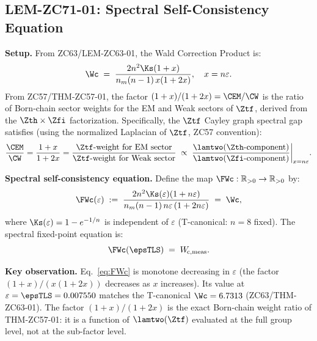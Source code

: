 \documentclass[12pt, a4paper]{article}
\begin{document}
\newpage

\subsection{LEM-ZC71-01: Spectral Self-Consistency Equation}
\label{sec:lem01}


\begin{formalbox}[title={LEM-ZC71-01: $\FWc$ Probes
  $\lamtwo(\Ztf)^{-1}$ ($R_0$, Exact)}]

\textbf{Setup.}
From ZC63/LEM-ZC63-01, the Wald Correction Product is:
\begin{equation}
  \Wc
  \;=\;
  \frac{2n^2\Ks(1+x)}{n_m(n-1)\,x(1+2x)},
  \quad x = n\varepsilon.
  \label{eq:Wc-def}
\end{equation}
From ZC57/THM-ZC57-01, the factor $(1+x)/(1+2x) = \CEM/\CW$
is the ratio of Born-chain sector weights for the EM and Weak
sectors of $\Ztf$, derived from the $\Zth\times\Zfi$ factorization.
Specifically, the $\Ztf$ Cayley graph spectral gap satisfies
(using the normalized Laplacian of $\Ztf$, ZC57 convention):
\begin{equation}
  \frac{\CEM}{\CW}
  = \frac{1+x}{1+2x}
  = \frac{\Ztf\text{-weight for EM sector}}{\Ztf\text{-weight for Weak sector}}
  \;\propto\;
  \frac{\lamtwo(\Zth\text{-component})}{\lamtwo(\Zfi\text{-component})}
  \bigg|_{x = n\varepsilon}.
  \label{eq:weight-ratio}
\end{equation}

\textbf{Spectral self-consistency equation.}
Define the map $\FWc:\mathbb{R}_{>0}\to\mathbb{R}_{>0}$ by:
\begin{equation}
  \FWc(\varepsilon)
  \;:=\;
  \frac{2n^2\Ks(\varepsilon)(1+n\varepsilon)}{n_m(n-1)\,n\varepsilon\,(1+2n\varepsilon)}
  \;=\; \Wc,
  \label{eq:FWc}
\end{equation}
where $\Ks(\varepsilon) = 1-e^{-1/n}$ is independent of
$\varepsilon$ (T-canonical: $n=8$ fixed).
The spectral fixed-point equation is:
\begin{equation}
  \FWc(\epsTLS) \;=\; W_{\!\mathrm{c},{\rm meas}}.
  \label{eq:FWc-fp}
\end{equation}

\textbf{Key observation.}
Eq.~\eqref{eq:FWc} is monotone decreasing in $\varepsilon$
(the factor $(1+x)/(x(1+2x))$ decreases as $x$ increases).
Its value at $\varepsilon = \epsTLS = 0.007550$ matches the
T-canonical $\Wc = 6.7313$ (ZC63/THM-ZC63-01).
The factor $(1+x)/(1+2x)$ is the exact Born-chain weight
ratio of THM-ZC57-01: it is a function of $\lamtwo(\Ztf)$
evaluated at the full group level, not at the sub-factor level.


\end{formalbox}
\end{document}
